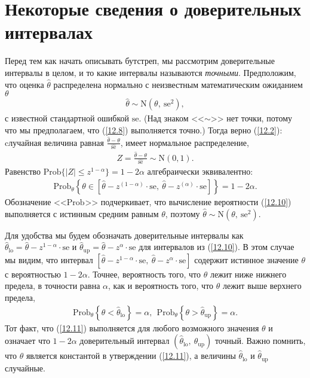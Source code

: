 \section{Некоторые сведения о доверительных интервалах}
Перед тем как начать описывать бутстреп, мы рассмотрим доверительные интервалы в целом, и то какие интервалы называются \textit{точными}. Предположим, что оценка $\widehat{\theta}$  распределена нормально с неизвестным математическим ожиданием $\theta$
\begin{gather}\label{12.8}
\widehat{\theta} \sim \mathrm{N}(\theta ,\ \text{se}^2),
\end{gather}
с известной стандартной ошибкой $\text{se}$. (Над знаком <<$\sim $>>  нет точки, потому что мы предполагаем, что (\ref{12.8}) выполняется точно.) Тогда верно (\ref{12.2}): cлучайная величина равная $\frac{\widehat{\theta} - \theta}{\widehat{\text{se}}}$, имеет нормальное распределение,
\begin{gather}\label{12.9}
Z = \frac{\widehat{\theta} - \theta}{\widehat{\text{se}}} \sim \mathrm{N}(0, 1).
\end{gather}
Равенство 
$\text{Prob}\{|Z|  \le z^{1 - \alpha }\} = 1 - 2 \alpha$ алгебраически эквивалентно:
\begin{gather}\label{12.10}
\text{Prob}_{\theta} \left\{ \theta \in [ \widehat{\theta} - z^{(1 - \alpha)} \cdot \text{se}, \ \widehat{\theta} - z^{(\alpha)} \cdot \text{se}]\right\} = 1 - 2 \alpha.
\end{gather}
Обозначение <<$\text{Prob}_{}$>> подчеркивает, что вычисление вероятности (\ref{12.10}) выполняется с истинным средним равным $\theta$, поэтому $\widehat{\theta} \sim \mathrm{N}(\theta ,\ \text{se}^2)$. 

Для удобства мы будем обозначать доверительные интервалы как $\widehat{\theta}_{\text{lo}} =\widehat{\theta} - z^{1 - \alpha } \cdot \text{se}$ и $\widehat{\theta}_{\text{up}} =\widehat{\theta} - z^{\alpha } \cdot \text{se}$ для интервалов из  (\ref{12.10}). В этом случае мы видим, что интервал $[\widehat{\theta} - z^{1 - \alpha } \cdot \text{se}, \ \widehat{\theta} - z^{\alpha } \cdot \text{se}]$ содержит истинное значение $\theta$  с вероятностью $1 - 2 \alpha$. Точнее, вероятность того, что $\theta$ лежит ниже нижнего предела, в точности равна $\alpha$, как и вероятность того, что $\theta$ лежит выше верхнего предела,
\begin{gather}\label{12.11}
\text{Prob}_{\theta}\left\{ \theta < \widehat{\theta}_{\text{lo}} \right\} = \alpha, 
\ \  \text{Prob}_{\theta} \left\{ \theta > \widehat{\theta}_{\text{up}} \right\} = \alpha.
\end{gather}
Тот факт, что (\ref{12.11}) выполняется для любого возможного значения 
$\theta$ и означает что $1 - 2 \alpha$ доверительный интервал $(\widehat{\theta}_{\text{lo}}, \  \widehat{\theta}_{\text{up}})$ точный. Важно помнить, что $\theta$ является константой в утверждении (\ref{12.11}), а величины $\widehat{\theta}_{\text{lo}}$ и $\widehat{\theta}_{\text{up}}$ случайные.

